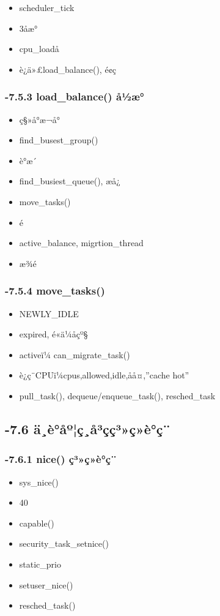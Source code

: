 \documentclass[11pt]{article}
\begin{document}
\begin{itemize}
\item scheduler\_tick
\item 3åæ°
\item cpu\_loadå
\item è¿­ä»£load\_balance(), é¢ç
\end{itemize}
\subsubsection{-7.5.3 load\_balance() å½æ°}
\label{sec-2.5.3}

\begin{itemize}
\item ç§»å°æ¬å°
\item find\_busest\_group()
\item è°æ´
\item find\_busiest\_queue(), æå¿
\item move\_tasks()
\item é
\item active\_balance, migrtion\_thread
\item æ¾é
\end{itemize}
\subsubsection{-7.5.4 move\_tasks()}
\label{sec-2.5.4}

\begin{itemize}
\item NEWLY\_IDLE
\item expired, é«ä¼åçº§
\item activeï¼ can\_migrate\_task()
\item è¿ç¨CPUï¼cpus,allowed,idle,åå¤,''cache hot''
\item pull\_task(), dequeue/enqueue\_task(), resched\_task
\end{itemize}
\subsection{-7.6 ä¸è°åº¦ç¸å³çç³»ç»è°ç¨}
\label{sec-2.6}


\subsubsection{-7.6.1 nice() ç³»ç»è°ç¨}
\label{sec-2.6.1}

\begin{itemize}
\item sys\_nice()
\item 40
\item capable()
\item security\_task\_setnice()
\item static\_prio
\item setuser\_nice()
\item resched\_task()
\end{itemize}
\end{document}
